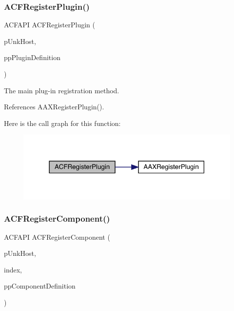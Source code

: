 \subsubsection{\texorpdfstring{ACFRegisterPlugin()}{ACFRegisterPlugin()}}
{\footnotesize\ttfamily A\+C\+F\+A\+PI A\+C\+F\+Register\+Plugin (\begin{DoxyParamCaption}\item[{\mbox{\hyperlink{a01409}{I\+A\+C\+F\+Unknown}} $\ast$}]{p\+Unk\+Host,  }\item[{I\+A\+C\+F\+Plugin\+Definition $\ast$$\ast$}]{pp\+Plugin\+Definition }\end{DoxyParamCaption})}



The main plug-\/in registration method. 



References A\+A\+X\+Register\+Plugin().

Here is the call graph for this function\+:
\nopagebreak
\begin{figure}[H]
\begin{center}
\leavevmode
\includegraphics[width=318pt]{a00500_aa455fa4d9a2236334d0fd959b4919788_cgraph}
\end{center}
\end{figure}
\mbox{\label{a00500_a68950ea83fea9b46b8f3fef409355b71}} 
\subsubsection{\texorpdfstring{ACFRegisterComponent()}{ACFRegisterComponent()}}
{\footnotesize\ttfamily A\+C\+F\+A\+PI A\+C\+F\+Register\+Component (\begin{DoxyParamCaption}\item[{\mbox{\hyperlink{a01409}{I\+A\+C\+F\+Unknown}} $\ast$}]{p\+Unk\+Host,  }\item[{acf\+U\+Int32}]{index,  }\item[{I\+A\+C\+F\+Component\+Definition $\ast$$\ast$}]{pp\+Component\+Definition }\end{DoxyParamCaption})}




